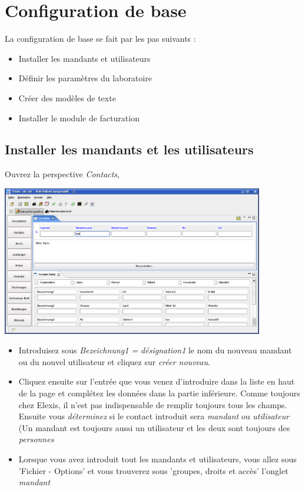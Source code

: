 \section{Configuration de base}
\label{grundkonfiguration}
La configuration de base se fait par les pas suivants :
\begin{itemize}
  \item Installer les mandants et utilisateurs
  \item Définir les paramètres du laboratoire
  \item Créer des modèles de texte
  \item Installer le module de facturation
\end{itemize}
\subsection{Installer les mandants et les utilisateurs}
Ouvrez la perspective \textit{Contacts},

\includegraphics[width=4.5in]{images/grundkonfkonta.png}
\begin{itemize}
 \item Introduisez sous \textit{Bezeichnung1 = désignation1} le nom du nouveau mandant ou du nouvel utilisateur et cliquez sur \textit{créer nouveau}.
 \item Cliquez ensuite sur l'entrée que vous venez d'introduire dans la liste en haut de la page et complétez les données dans la partie inférieure. Comme toujours chez Elexis, il n'est pas indispensable de remplir toujours tous les champs. Ensuite vous \textit{déterminez} si le contact introduit sera  \textit{mandant} ou \textit{utilisateur} (Un mandant est toujours aussi un utilisateur et les deux sont toujours des \textit{personnes}
 \item Lorsque vous avez introduit tout les mandants et utilisateurs, vous allez sous 'Fichier - Options' et vous trouverez sous 'groupes, droits et accès' l'onglet \textit{mandant}
\end{itemize}

